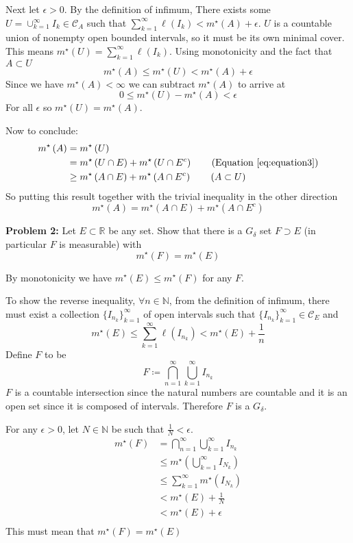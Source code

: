 \documentclass[11pt]{article}
\newcommand{\mstar}[1]{m^{\star}\left(#1\right)}
\begin{document}
    Next let $\epsilon > 0$.
    By the definition of infimum, There exists some $U = \cup_{k=1}^{\infty} I_k \in \mathcal{C}_A$ such that $\sum_{k=1}^{\infty} \ell (I_k) < \mstar{A} + \epsilon$.
    $U$ is a countable union of nonempty open bounded intervals, so it must be its own minimal cover.
    This means $\mstar{U} = \sum_{k=1}^{\infty} \ell (I_k)$.
    Using monotonicity and the fact that $A \subset U$
    \[
        \mstar{A} \leq \mstar{U} < \mstar{A} + \epsilon
    \]
    Since we have $\mstar{A} < \infty$ we can subtract $\mstar{A}$ to arrive at
    \[
        0 \leq \mstar{U} - \mstar{A} < \epsilon
    \]
    For all $\epsilon$ so $\mstar{U} = \mstar{A}$.

    Now to conclude:
    \begin{align*}
        \mstar{A} &= \mstar{U} \\
        &= \mstar{U  \cap E} + \mstar{U \cap E^c} \tag{Equation~\eqref{eq:equation3}} \\
        &\geq \mstar{A \cap E} + \mstar{A \cap E^c} \tag{$A \subset U$}
    \end{align*}
    So putting this result together with the trivial inequality in the other direction
    \[
        \mstar{A} = \mstar{A \cap E} + \mstar{A \cap E^c}
    \]

    \clearpage
    \begin{mybox}
        \textbf{Problem 2:}
        Let $E \subset \mathbb{R}$ be any set.
        Show that there is a $G_\delta$ set $F \supset E$ (in particular $F$ is measurable) with
        \[
            \mstar{F} = \mstar{E}
        \]
    \end{mybox}
    By monotonicity we have $\mstar{E} \leq \mstar{F}$ for any $F$.

    To show the reverse inequality, $\forall n \in \mathbb{N}$, from the definition of infimum, there must exist a collection $\{ I_{n_k} \}_{k=1}^{\infty}$ of open intervals such that $\{ I_{n_k} \}_{k=1}^{\infty} \in \mathcal{C}_E$ and
    \[
        \mstar{E} \leq \sum_{k=1}^{\infty} \ell (I_{n_k}) < \mstar{E} + \frac{1}{n}
    \]
    Define $F$ to be
    \[
        F \coloneqq \bigcap_{n=1}^{\infty} \bigcup_{k=1}^{\infty} I_{n_k}
    \]
    $F$ is a countable intersection since the natural numbers are countable and it is an open set since it is composed of intervals.
    Therefore $F$ is a $G_{\delta}$.

    For any $\epsilon > 0$, let $N \in \mathbb{N}$ be such that $\frac{1}{N} < \epsilon$.
    \begin{align*}
        \mstar{F} &= \bigcap_{n=1}^{\infty} \bigcup_{k=1}^{\infty} I_{n_k} \\
        &\leq \mstar{\bigcup_{k=1}^{\infty} I_{N_k}} \tag{Monotonicity} \\
        &\leq \sum_{k=1}^{\infty} \mstar{I_{N_k}} \tag{Subadditivity} \\
        &< \mstar{E} + \frac{1}{N} \\
        &< \mstar{E} + \epsilon \\
    \end{align*}
    This must mean that $\mstar{F} = \mstar{E}$
\end{document}
